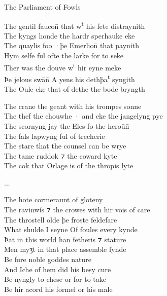 \begin{texts}{The Parliament of Fowls}
\begin{textglossed}
The gentil faucon̄ that w\textsuperscript{t} his fete distraynith\\
The kyngs honde the hardr sperhauke eke\\
The quaylis foo ·\.{þ}e Emerlion̄ that paynith\\
Hym selfe ful ofte the larke for to seke\\
Ther was the douve w\textsuperscript{t} hir eyne meke\\
Þe jelous swān̄ A yens his deth\.{þ}a\textsuperscript{t} syngith\\
The Oule eke that of dethe the bode bryngth

The crane the geant with his trompes sonne\\
The thef the chouwhe · and eke the jangelyng pye\\
The scornyng jay the Eles fo the heroūn̄\\
The fals lapwyng ful of trecherie\\
The stare that the counsel can be wrye\\
The tame ruddok ⁊ the coward kyte\\
The cok that Orlage is of the thropis lyte

...

The hote cormeraunt of gloteny\\
The ravinwís ⁊ the crowes with hir vois of care\\
The throstell olde \.{þ}e froste feldefare\\
What shulde I seyne Of foules every kynde\\
Þat in this world han fetheris ⁊ stature\\
Men myʒt in that place assemble fynde\\
Be fore noble goddes nature\\
And Iche of hem did his besy cure\\
Be nyngly to chese or for to take\\
Be hir acord his formel or his male
\end{textglossed}


\end{texts}

